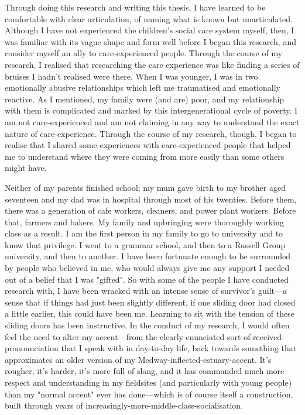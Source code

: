 Through doing this research and writing this thesis, I have learned to be comfortable with clear articulation, of naming what is known but unarticulated. Although I have not experienced the children’s social care system myself, then, I was familiar with its vague shape and form well before I began this research, and consider myself an ally to care-experienced people. Through the course of my research, I realised that researching the care experience was like finding a series of bruises I hadn’t realised were there. When I was younger, I was in two emotionally abusive relationships which left me traumatised and  emotionally reactive. As I mentioned, my family were (and are) poor, and my relationship with them is complicated and marked by this intergenerational cycle of poverty. I am not care-experienced and am not claiming in any way to understand the exact nature of care-experience. Through the course of my research, though, I began to realise that I shared some experiences with care-experienced people that helped me to understand where they were coming from more easily than some others might have. 

Neither of my parents finished school; my mum gave birth to my brother aged seventeen and my dad was in hospital through most of his twenties. Before them, there was a generation of cafe workers, cleaners, and power plant workers. Before that, farmers and bakers. My family and upbringing were thoroughly working class as a result. I am the first person in my family to go to university and to know that privilege. I went to a grammar school, and then to a Russell Group university, and then to another. I have been fortunate enough to be surrounded by people who believed in me, who would always give me any support I needed out of a belief that I was "gifted". So with some of the people I have conducted research with, I have been wracked with an intense sense of survivor’s guilt—a sense that if things had just been slightly different, if one sliding door had closed a little earlier, this could have been me. Learning to sit with the tension of these sliding doors has been instructive. In the conduct of my research, I would often feel the need to alter my accent—from the clearly-enunciated sort-of-received-pronounciation that I speak with in day-to-day life, back towards something that approximates an older version of my Medway-inflected-estuary-accent. It’s rougher, it’s harder, it’s more full of slang, and it has commanded much more respect and understanding in my fieldsites (and particularly with young people) than my "normal accent" ever has done—which is of course itself a construction, built through years of increasingly-more-middle-class-socialisation.

